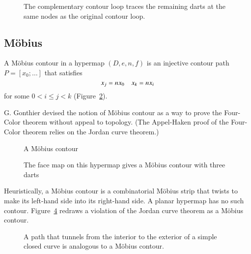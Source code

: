 \begin{figure}[htb]
\centering
{}
\caption{The complementary contour loop traces the remaining darts
at the same nodes as the original contour loop. }
\label{fig:contour-comp}
\end{figure}
%

\subsection{M\"obius}

\begin{definition} A M\"obius contour in a hypermap
$(D,e,n,f)$ is an
injective contour path $P=[x_0;\ldots]$ that satisfies
\begin{equation}
\tlabel{eqn:mobius}
x_j = n x_0\quad x_k = n x_i
\end{equation}
for some $0 < i\le j< k$ (Figure~\ref{fig:mobius}).
%
\end{definition}


\begin{remark}
G. Gonthier devised the notion of M\"obius contour as a way to prove
the Four-Color theorem without appeal to topology.  (The Appel-Haken
proof of the Four-Color theorem relies on the Jordan curve theorem.)
\end{remark}

\begin{figure}[htb]
\centering
{}
\caption{A M\"obius contour}
\label{fig:mobius}
\end{figure}

\begin{figure}[htb]
\centering
{}
\caption{The face map on this hypermap gives a M\"obius contour with
three darts}
\label{fig:3m}
\end{figure}

\begin{remark} Heuristically, a M\"obius contour is a 
combinatorial M\"obius strip that
twists to make 
its left-hand side into
its right-hand side.  A planar hypermap has no such contour.  
Figure~\ref{fig:violate-jct}
redraws a violation of the Jordan curve theorem
as a M\"obius contour.   
\end{remark}

\begin{figure}[htb]
\centering
{}
\caption{A path that tunnels from the interior to the exterior
of a simple closed curve
is analogous to a M\"obius contour.}
\label{fig:violate-jct}
\end{figure}

